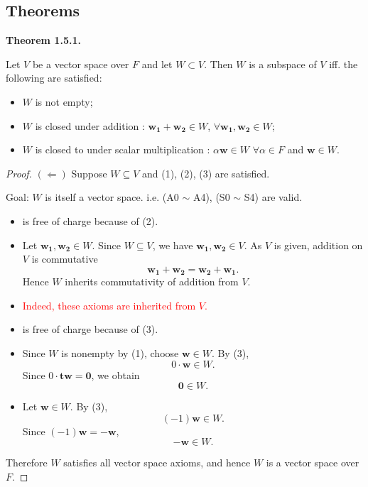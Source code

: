 \documentclass[12pt]{article}
\begin{document}
\subsection{Theorems}
\textbf{Theorem 1.5.1.}

Let $V$ be a vector space over $F$ and let $W \subset V$. Then $W$ is a subspace of $V$ iff. the following are satisfied:
\begin{itemize}
    \item $W$ is not empty;
    \item $W$ is closed under addition : $\mathbf{w_1} + \mathbf{w_2} \in W$, $\forall \mathbf{w_1}, \mathbf{w_2} \in W$;
    \item $W$ is closed to under scalar multiplication : $\alpha\mathbf{w} \in W$ $\forall \alpha \in F$ and $\mathbf{w} \in W$.
\end{itemize}

\begin{proof}
$(\Leftarrow)$ Suppose $W \subseteq V$ and (1), (2), (3) are satisfied.

Goal: $W$ is itself a vector space. i.e. (A0 $\sim$ A4), (S0 $\sim$ S4) are valid.

\begin{itemize}
    \item[(A0)] is free of charge because of (2).
    
    \bigskip

    \item[(A1)] Let $\mathbf{w_1, w_2}\in W$. Since $W\subseteq V$, we have
    $\mathbf{w_1, w_2}\in V$. As $V$ is given, addition on $V$ is commutative
    \[
        \mathbf{w_1 + w_2 = w_2 + w_1}.
    \]
    Hence $W$ inherits commutativity of addition from $V$.

    \bigskip

    \item[\textcolor{red}{(A2), (S1)$\sim$(S4)}] \textcolor{red}{Indeed, these axioms are inherited from $V$.}

    \bigskip
    
    \item[(S0)] is free of charge because of (3).

    \bigskip

    \item[(A3)] Since $W$ is nonempty by (1), choose $\mathbf{w}\in W$. By (3),
    \[
        0\cdot \mathbf{w}\in W.
    \]
    Since $0\cdot \mathbf{tw} = \mathbf{0}$, we obtain
    \[
        \mathbf{0}\in W.
    \]

    \bigskip

    \item[(A4)] Let $\mathbf{w}\in W$. By (3),
    \[
        (-1)\mathbf{w}\in W.
    \]
    Since $(-1)\mathbf{w = -w}$,
    \[
        \mathbf{-w}\in W.
    \]

    \bigskip

\end{itemize}

Therefore $W$ satisfies all vector space axioms, and hence $W$ is a vector space over $F$.

\end{proof}
\end{document}
